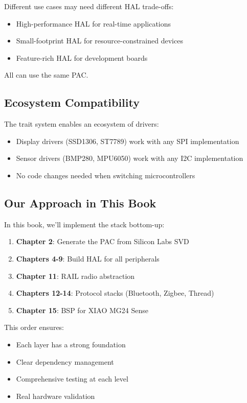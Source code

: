 Different use cases may need different HAL trade-offs:
\begin{itemize}
    \item High-performance HAL for real-time applications
    \item Small-footprint HAL for resource-constrained devices
    \item Feature-rich HAL for development boards
\end{itemize}

All can use the same PAC.

\subsection{Ecosystem Compatibility}

The  trait system enables an ecosystem of drivers:
\begin{itemize}
    \item Display drivers (SSD1306, ST7789) work with any SPI implementation
    \item Sensor drivers (BMP280, MPU6050) work with any I2C implementation
    \item No code changes needed when switching microcontrollers
\end{itemize}

\subsection{Our Approach in This Book}
\label{sec:our-approach}

In this book, we'll implement the stack bottom-up:

\begin{enumerate}
    \item \textbf{Chapter 2}: Generate the PAC from Silicon Labs SVD
    \item \textbf{Chapters 4-9}: Build HAL for all peripherals
    \item \textbf{Chapter 11}: RAIL radio abstraction
    \item \textbf{Chapters 12-14}: Protocol stacks (Bluetooth, Zigbee, Thread)
    \item \textbf{Chapter 15}: BSP for XIAO MG24 Sense
\end{enumerate}

This order ensures:
\begin{itemize}
    \item Each layer has a strong foundation
    \item Clear dependency management
    \item Comprehensive testing at each level
    \item Real hardware validation
\end{itemize}

